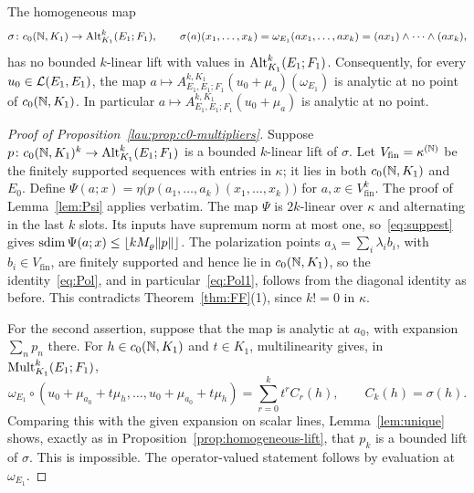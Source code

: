 \begin{proposition}[multipliers on $c_0$]\label{lau:prop:c0-multipliers}
The homogeneous map
\[
 \sigma\colon c_0(\mathbb N,K_1)\to\operatorname{Alt}^k_{K_1}(E_1;F_1),\qquad
 \sigma(a)(x_1,\dots,x_k)=\omega_{E_1}(ax_1,\dots,ax_k)=(ax_1)\wedge\dots\wedge(ax_k),
\]
has no bounded $k$\nobreakdash-linear lift with values in $\operatorname{Alt}^k_{K_1}(E_1;F_1)$. Consequently, for every
$u_0\in\mathcal L(E_1,E_1)$, the map $a\mapsto A^{k,K_1}_{E_1,E_1;F_1}(u_0+\mu_a)(\omega_{E_1})$ is analytic at no point of $c_0(\mathbb N,K_1)$. In
particular $a\mapsto A^{k,K_1}_{E_1,E_1;F_1}(u_0+\mu_a)$ is analytic at no point.
\end{proposition}



\begin{proof}[Proof of Proposition~\ref{lau:prop:c0-multipliers}]
Suppose $p\colon c_0(\mathbb N,K_1)^k\to\operatorname{Alt}^k_{K_1}(E_1;F_1)$ is a bounded $k$\nobreakdash-linear lift of $\sigma$. Let
$V_{\mathrm{fin}}=\kappa^{(\mathbb N)}$ be the finitely supported sequences with entries in $\kappa$; it lies in both $c_0(\mathbb N,K_1)$
and $E_0$. Define $\Psi(a;x)=\eta\bigl(p(a_1,\dots,a_k)(x_1,\dots,x_k)\bigr)$ for $a,x\in V_{\mathrm{fin}}^k$. The proof of
Lemma~\ref{lem:Psi} applies verbatim. The map $\Psi$ is $2k$\nobreakdash-linear over $\kappa$ and alternating in the last
$k$ slots. Its inputs have supremum norm at most one, so~\eqref{eq:suppest} gives
$\operatorname{sdim}\Psi(a;x)\le\lfloor kM_\varrho\lVert p\rVert\rfloor$. The polarization points $a_\lambda=\sum_i\lambda_ib_i$, with
$b_i\in V_{\mathrm{fin}}$, are finitely supported and hence lie in $c_0(\mathbb N,K_1)$, so the identity~\eqref{eq:Pol}, and in
particular~\eqref{eq:Pol1}, follows from the diagonal identity as before. This contradicts Theorem~\ref{thm:FF}(1), since
$k!=0$ in $\kappa$.

For the second assertion, suppose that the map is analytic at $a_0$, with expansion $\sum_n p_n$ there. For
$h\in c_0(\mathbb N,K_1)$ and $t\in K_1$, multilinearity gives, in $\operatorname{Mult}^k_{K_1}(E_1;F_1)$,
\[
 \omega_{E_1}\circ(u_0+\mu_{a_0}+t\mu_h,\dots,u_0+\mu_{a_0}+t\mu_h)=\sum_{r=0}^kt^rC_r(h),\qquad C_k(h)=\sigma(h).
\]
Comparing this with the given expansion on scalar lines, Lemma~\ref{lem:unique} shows, exactly as in
Proposition~\ref{prop:homogeneous-lift}, that $p_k$ is a bounded lift of $\sigma$. This is impossible. The operator-valued
statement follows by evaluation at $\omega_{E_1}$.
\end{proof}

